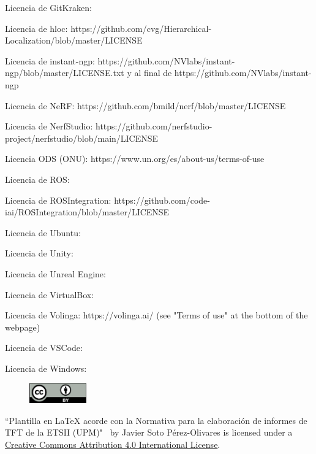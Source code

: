 \documentclass[a4paper, 12pt, spanish, twoside]{article}
\begin{document}
Licencia de GitKraken: 

Licencia de hloc: https://github.com/cvg/Hierarchical-Localization/blob/master/LICENSE

Licencia de instant-ngp: https://github.com/NVlabs/instant-ngp/blob/master/LICENSE.txt y al final de https://github.com/NVlabs/instant-ngp

Licencia de NeRF: https://github.com/bmild/nerf/blob/master/LICENSE

Licencia de NerfStudio: https://github.com/nerfstudio-project/nerfstudio/blob/main/LICENSE

Licencia ODS (ONU): https://www.un.org/es/about-us/terms-of-use

Licencia de ROS: 

Licencia de ROSIntegration: https://github.com/code-iai/ROSIntegration/blob/master/LICENSE

Licencia de Ubuntu: 

Licencia de Unity: 

Licencia de Unreal Engine: 

Licencia de VirtualBox: 

Licencia de Volinga: https://volinga.ai/ (see "Terms of use" at the bottom of the webpage)

Licencia de VSCode: 

Licencia de Windows: 

\begin{figure}
    \vspace{-\baselineskip}
    \href{http://creativecommons.org/licenses/by/4.0/}{\includegraphics[width=0.22\textwidth]{licencias/cc-by.png}}
\end{figure} 

``Plantilla en LaTeX acorde con la Normativa para la elaboración de informes de TFT de la ETSII (UPM)" \ by Javier Soto Pérez-Olivares is licensed under a \href{http://creativecommons.org/licenses/by/4.0/}{Creative Commons Attribution 4.0 International License}.

\clearpage



\end{document}
